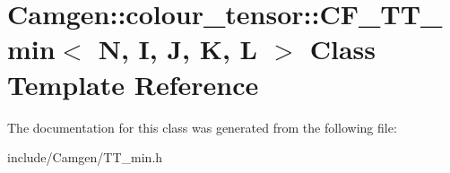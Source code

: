\hypertarget{a00036}{}\section{Camgen\+:\+:colour\+\_\+tensor\+:\+:C\+F\+\_\+\+T\+T\+\_\+min$<$ N, I, J, K, L $>$ Class Template Reference}
\label{a00036}


The documentation for this class was generated from the following file\+:\begin{DoxyCompactItemize}
\item 
include/\+Camgen/T\+T\+\_\+min.\+h\end{DoxyCompactItemize}
